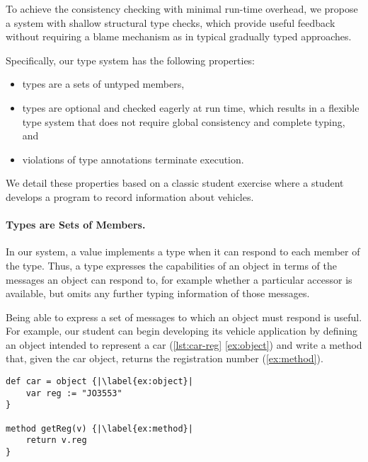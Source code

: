 To achieve the consistency checking with minimal run-time overhead,
we propose a system with shallow structural type checks,
which provide useful feedback without requiring a blame mechanism
as in typical gradually typed approaches.


Specifically, our type system has the following properties:

\begin{itemize}
  \item types are a sets of untyped members,
  \item types are optional and checked eagerly at run time,
        which results in a flexible type system that does not require global
        consistency and complete typing, and
  \item violations of type annotations terminate execution.
\end{itemize}


We detail these properties
based on a classic student exercise where a student develops
a program to record information about vehicles.

\paragraph{Types are Sets of Members.}

In our system, a value implements a type when it
can respond to each member of the type.
Thus, a type expresses the capabilities
of an object in terms of the messages an object
can respond to, for example whether a particular accessor is
available, but omits any further typing information of those messages.

Being able to express a set of messages to which an object
must respond is useful. For example, our student can begin
developing its vehicle application
by defining an object
intended to represent a car (\cref{lst:car-reg} \cref{ex:object}) and write a method that, 
given the car object,
returns the registration number (\cref{ex:method}).


\begin{lstlisting}[caption={The start of a simple program for tracking vehicle information.},label=lst:car-reg,escapechar=|,float,floatplacement=htbp]
def car = object {|\label{ex:object}|
    var reg := "JO3553"
}

method getReg(v) {|\label{ex:method}|
    return v.reg
}
\end{lstlisting}

